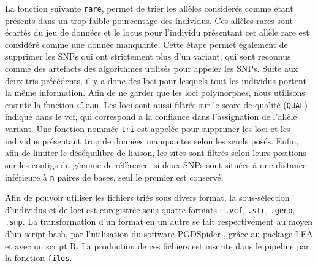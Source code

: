 La fonction suivante \verb|rare|, permet de trier les allèles considérés comme étant présents dans un trop faible pourcentage des individus.
 Ces allèles rares sont écartés du jeu de données et le locus pour l'individu présentant cet allèle rare est considéré comme une donnée manquante.
 Cette étape permet également de supprimer les SNPs qui ont strictement plus d'un variant, qui sont reconnus comme des artefacts des algorithmes utilisés pour appeler les SNPs.
 Suite aux deux tris précédents, il y a donc des loci pour lesquels tout les individus portent la même information.
 Afin de ne garder que les loci polymorphes, nous utilisons ensuite la fonction \verb|clean|.
Les loci sont aussi filtrés sur le score de qualité (\verb|QUAL|) indiqué dans le vcf, qui correspond a la confiance dans l'assignation de l'allèle variant.
 Une fonction nommée \verb|tri| est appelée pour supprimer les loci et les individus présentant trop de données manquantes selon les seuils posés.
 Enfin, afin de limiter le déséquilibre de liaison, les sites sont filtrés selon leurs positions sur les contigs du génome de référence: si deux SNPs sont situées à une distance inférieure à \verb|n| paires de bases, seul le premier est conservé.


Afin de pouvoir utiliser les fichiers triés sous divers format, la sous-sélection d'individus et de loci est enregistrée sous quatre formats : \verb|.vcf|, \verb|.str|, \verb|.geno|, \verb|.snp|.
 La transformation d'un format en un autre se fait respectivement au moyen d'un script bash, par l'utilisation du software PGDSpider \citep{Lischer2012}, grâce au package LEA \citep{Frichot2015} et avec un script R.
 La production de ces fichiers est inscrite dans le pipeline par la fonction \verb|files|.

